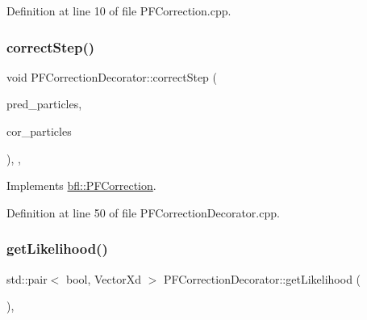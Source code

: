 Definition at line 10 of file P\+F\+Correction.\+cpp.

\mbox{\label{classbfl_1_1PFCorrectionDecorator_a83bb9ac8ba168f99f211973ae634391a}} 
\subsubsection{\texorpdfstring{correct\+Step()}{correctStep()}}
{\footnotesize\ttfamily void P\+F\+Correction\+Decorator\+::correct\+Step (\begin{DoxyParamCaption}\item[{const \mbox{\hyperlink{classbfl_1_1ParticleSet}{bfl\+::\+Particle\+Set}} \&}]{pred\+\_\+particles,  }\item[{\mbox{\hyperlink{classbfl_1_1ParticleSet}{bfl\+::\+Particle\+Set}} \&}]{cor\+\_\+particles }\end{DoxyParamCaption})\hspace{0.3cm}{\ttfamily [override]}, {\ttfamily [protected]}, {\ttfamily [virtual]}}



Implements \mbox{\hyperlink{classbfl_1_1PFCorrection_ae0413156a1258d88485e57a983c89af1}{bfl\+::\+P\+F\+Correction}}.



Definition at line 50 of file P\+F\+Correction\+Decorator.\+cpp.

\mbox{\label{classbfl_1_1PFCorrectionDecorator_a019f207b8348f5f61e700e8a4ca38bfd}} 
\subsubsection{\texorpdfstring{get\+Likelihood()}{getLikelihood()}}
{\footnotesize\ttfamily std\+::pair$<$ bool, Vector\+Xd $>$ P\+F\+Correction\+Decorator\+::get\+Likelihood (\begin{DoxyParamCaption}{ }\end{DoxyParamCaption})\hspace{0.3cm}{\ttfamily [override]}, {\ttfamily [virtual]}}



